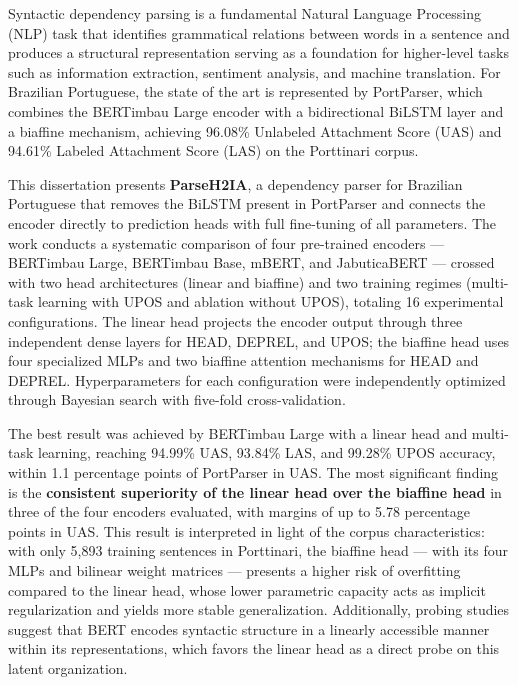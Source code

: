 Syntactic dependency parsing is a fundamental Natural Language Processing (NLP) task that
identifies grammatical relations between words in a sentence and produces a structural
representation serving as a foundation for higher-level tasks such as information extraction,
sentiment analysis, and machine translation. For Brazilian Portuguese, the state of the art is
represented by PortParser, which combines the BERTimbau Large encoder with a bidirectional
BiLSTM layer and a biaffine mechanism, achieving 96.08\% Unlabeled Attachment Score (UAS) and
94.61\% Labeled Attachment Score (LAS) on the Porttinari corpus.

This dissertation presents \textbf{ParseH2IA}, a dependency parser for Brazilian Portuguese
that removes the BiLSTM present in PortParser and connects the encoder directly to prediction
heads with full fine-tuning of all parameters. The work conducts a systematic comparison of
four pre-trained encoders — BERTimbau Large, BERTimbau Base, mBERT, and JabuticaBERT —
crossed with two head architectures (linear and biaffine) and two training regimes (multi-task
learning with UPOS and ablation without UPOS), totaling 16 experimental configurations. The
linear head projects the encoder output through three independent dense layers for HEAD, DEPREL,
and UPOS; the biaffine head uses four specialized MLPs and two biaffine attention mechanisms for
HEAD and DEPREL. Hyperparameters for each configuration were independently optimized through
Bayesian search with five-fold cross-validation.

The best result was achieved by BERTimbau Large with a linear head and multi-task learning,
reaching 94.99\% UAS, 93.84\% LAS, and 99.28\% UPOS accuracy, within 1.1 percentage points of
PortParser in UAS. The most significant finding is the \textbf{consistent superiority of the
linear head over the biaffine head} in three of the four encoders evaluated, with margins of
up to 5.78 percentage points in UAS. This result is interpreted in light of the corpus
characteristics: with only 5,893 training sentences in Porttinari, the biaffine head — with
its four MLPs and bilinear weight matrices — presents a higher risk of overfitting compared
to the linear head, whose lower parametric capacity acts as implicit regularization and yields
more stable generalization. Additionally, probing studies suggest that BERT encodes syntactic
structure in a linearly accessible manner within its representations, which favors the linear
head as a direct probe on this latent organization.

